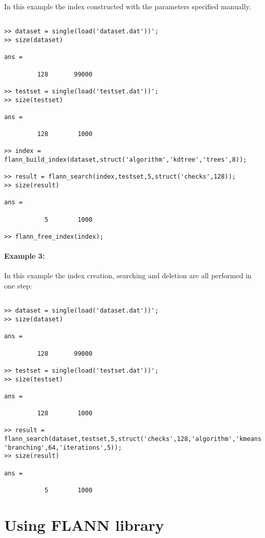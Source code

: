 \documentclass[letter,10pt]{article}
\begin{document}
In this example the index constructed with the parameters specified manually.

\begin{Verbatim}[fontsize=\footnotesize,frame=single]

>> dataset = single(load('dataset.dat'))';
>> size(dataset)

ans =

         128       99000

>> testset = single(load('testset.dat'))';
>> size(testset)

ans =

         128        1000

>> index = flann_build_index(dataset,struct('algorithm','kdtree','trees',8));

>> result = flann_search(index,testset,5,struct('checks',128));
>> size(result)

ans =

           5        1000

>> flann_free_index(index);

\end{Verbatim}

\paragraph{Example 3:}

In this example the index creation, searching and deletion are all performed in one step:

\begin{Verbatim}[fontsize=\footnotesize,frame=single]

>> dataset = single(load('dataset.dat'))';
>> size(dataset)

ans =

         128       99000

>> testset = single(load('testset.dat'))';
>> size(testset)

ans =

         128        1000

>> result = flann_search(dataset,testset,5,struct('checks',128,'algorithm','kmeans',
'branching',64,'iterations',5));
>> size(result)

ans =

           5        1000

\end{Verbatim}

\section{Using FLANN library}
\end{document}
